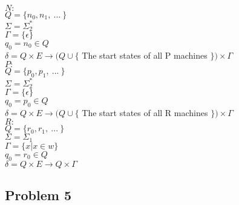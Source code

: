 \documentclass{article}
\begin{document}
\begin{enumerate}[a)]
\begin{enumerate}[i)]
$N:$\\
$Q=\{n_0,n_1,\ ...\ \}$\\
$\Sigma = \Sigma^*_2$ \\
$\Gamma = \{\epsilon\}$ \\
$q_0 = n_0 \in Q$ \\
$\delta = Q \times E \rightarrow (Q \cup \{$ The start states of all P machines $\}) \times \Gamma $ \\

$P:$\\
$Q=\{p_0,p_1,\ ...\ \}$\\
$\Sigma = \Sigma^*_2$ \\
$\Gamma = \{\epsilon\}$ \\
$q_0 = p_0 \in Q$ \\
$\delta = Q \times E \rightarrow (Q \cup \{$ The start states of all R machines $\}) \times \Gamma $ \\

$R:$\\
$Q=\{r_0,r_1,\ ...\ \}$\\
$\Sigma = \Sigma_1$ \\
$\Gamma = \{x | x \in w\}$ \\
$q_0 = r_0 \in Q$ \\
$\delta = Q \times E \rightarrow Q \times \Gamma $


    \end{enumerate}
\end{enumerate}

\newpage

\subsection*{Problem 5}
\end{document}
